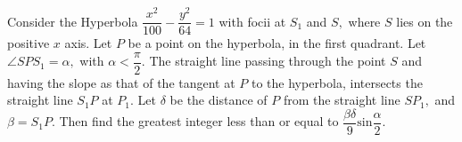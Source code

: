 Consider the Hyperbola $\dfrac{x^2}{100}-\dfrac{y^2}{64}=1$ with focii at $S_1$ and $S,$ where $S$ lies on the positive $x$ axis. Let $P$ be a point on the hyperbola, in the first quadrant. Let $\angle SPS_1=\alpha,$ with $\alpha<\dfrac{\pi}{2}.$ The straight line passing through the point $S$ and having the slope as that of the tangent at $P$ to the hyperbola, intersects the straight line $S_1P$ at $P_1.$ Let $\delta$ be the distance of $P$ from the straight line $SP_1,$ and $\beta=S_1P.$ Then find the greatest integer less than or equal to $\dfrac{\beta\delta}{9} \mathrm{sin}   \dfrac{\alpha}{2}.$
